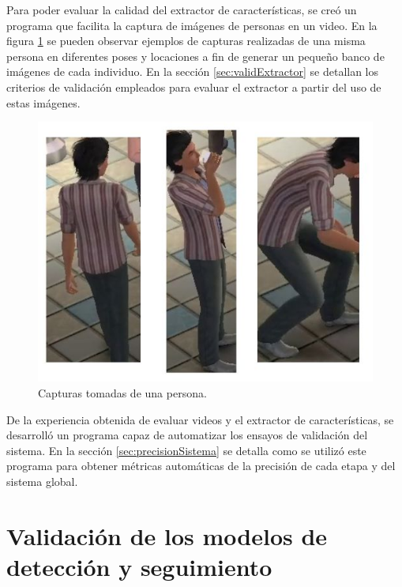 Para poder evaluar la calidad del extractor de características, se creó un programa que facilita la captura de imágenes de personas en un video. En la figura \ref{fig:imagenesCrop} se pueden observar ejemplos de capturas realizadas de una misma persona en diferentes poses y locaciones a fin de generar un pequeño banco de imágenes de cada individuo. En la sección \ref{sec:validExtractor} se detallan los criterios de validación empleados para evaluar el extractor a partir del uso de estas imágenes.

\newpage

\begin{figure}[ht]
	\centering
	\includegraphics[scale=.45]{./Figures/imagenesCrop.jpg}
	\caption{Capturas tomadas de una persona.}
	\label{fig:imagenesCrop}
\end{figure}

De la experiencia obtenida de evaluar videos y el extractor de características, se desarrolló un programa capaz de automatizar los ensayos de validación del sistema. En la sección \ref{sec:precisionSistema} se detalla como se utilizó este programa para obtener métricas automáticas de la precisión de cada etapa y del sistema global.



\section{Validación de los modelos de detección y seguimiento}
\label{sec:validDetectorSeguidor}

